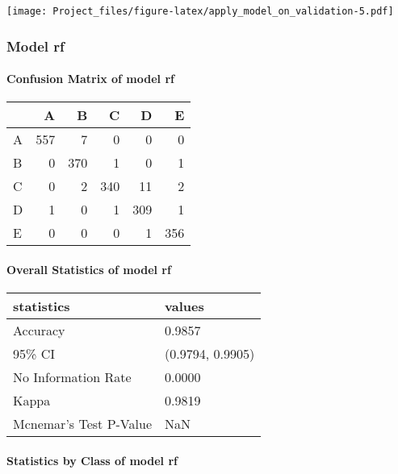 \documentclass[]{article}
\let\oldparagraph\paragraph
\renewcommand{\paragraph}[1]{\oldparagraph{#1}\mbox{}}
\begin{document}
\texttt{[image: Project\_files/figure-latex/apply\_model\_on\_validation-5.pdf]}

\subsubsection{Model rf}\label{model-rf}

\paragraph{Confusion Matrix of model
rf}\label{confusion-matrix-of-model-rf}

\begin{table}[H]
\centering
\begin{tabular}{l|r|r|r|r|r}
\hline
  & A & B & C & D & E\\
\hline
A & 557 & 7 & 0 & 0 & 0\\
\hline
B & 0 & 370 & 1 & 0 & 1\\
\hline
C & 0 & 2 & 340 & 11 & 2\\
\hline
D & 1 & 0 & 1 & 309 & 1\\
\hline
E & 0 & 0 & 0 & 1 & 356\\
\hline
\end{tabular}
\end{table}

\paragraph{Overall Statistics of model
rf}\label{overall-statistics-of-model-rf}

\begin{table}[H]
\centering
\begin{tabular}{l|l}
\hline
statistics & values\\
\hline
Accuracy & 0.9857\\
\hline
95\% CI & (0.9794, 0.9905)\\
\hline
No Information Rate & 0.0000\\
\hline
Kappa & 0.9819\\
\hline
Mcnemar's Test P-Value & NaN\\
\hline
\end{tabular}
\end{table}

\paragraph{Statistics by Class of model
rf}\label{statistics-by-class-of-model-rf}
\end{document}
